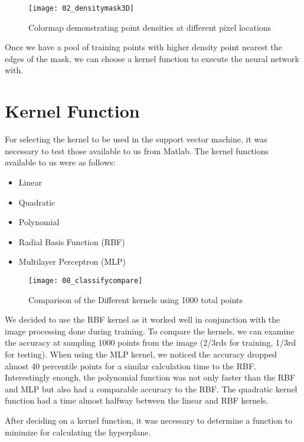 \begin{figure}[ht]
    \centering
    \texttt{[image: 02\_densitymask3D]}
    \caption{Colormap demonstrating point densities at different pixel locations}
    \label{fig:02_densitymask3D}
\end{figure}

Once we have a pool of training points with higher density point nearest the edges of the mask, we can choose a kernel function to execute the neural network with.

\newpage
\section{Kernel Function}

For selecting the kernel to be used in the support vector machine, it was necessary to test those available to us from Matlab. The kernel functions available to us were as follows:

\begin{itemize}
  \item Linear
  \item Quadratic
  \item Polynomial
  \item Radial Basis Function (RBF)
  \item Multilayer Perceptron (MLP)
\end{itemize}

\begin{figure}[ht]
    \centering
    \texttt{[image: 08\_classifycompare]}
    \caption{Comparison of the Different kernels using 1000 total points}
    \label{fig:08_classifycompare}
\end{figure}

We decided to use the RBF kernel as it worked well in conjunction with the image processing done during training. To compare the kernels, we can examine the accuracy at sampling 1000 points from the image (2/3rds for training, 1/3rd for testing). When using the MLP kernel, we noticed the accuracy dropped almost 40 percentile points for a similar calculation time to the RBF. Interestingly enough, the polynomial function was not only faster than the RBF and MLP but also had a comparable accuracy to the RBF. The quadratic kernel function had a time almost halfway between the linear and RBF kernels.

After deciding on a kernel function, it was necessary to determine a function to minimize for calculating the hyperplane.

